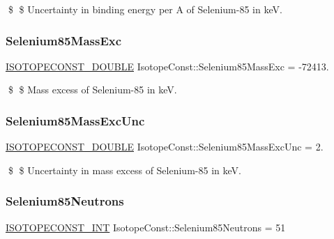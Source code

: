 \$ \$ Uncertainty in binding energy per A of Selenium-\/85 in keV. \mbox{\label{group___isotope_const-_selenium-_se85_ga3ffad5c7e9959d4405d59291e34cefa8}} 
\subsubsection{\texorpdfstring{Selenium85\+Mass\+Exc}{Selenium85MassExc}}
{\footnotesize\ttfamily \mbox{\hyperlink{group___isotope_const-_macros_ga8f45a7272ce02c0b4c65c44636ed719a}{I\+S\+O\+T\+O\+P\+E\+C\+O\+N\+S\+T\+\_\+\+D\+O\+U\+B\+LE}} Isotope\+Const\+::\+Selenium85\+Mass\+Exc = -\/72413.}

\$ \$ Mass excess of Selenium-\/85 in keV. \mbox{\label{group___isotope_const-_selenium-_se85_ga5c2b5fad192e6cfde80d8de9420aad96}} 
\subsubsection{\texorpdfstring{Selenium85\+Mass\+Exc\+Unc}{Selenium85MassExcUnc}}
{\footnotesize\ttfamily \mbox{\hyperlink{group___isotope_const-_macros_ga8f45a7272ce02c0b4c65c44636ed719a}{I\+S\+O\+T\+O\+P\+E\+C\+O\+N\+S\+T\+\_\+\+D\+O\+U\+B\+LE}} Isotope\+Const\+::\+Selenium85\+Mass\+Exc\+Unc = 2.}

\$ \$ Uncertainty in mass excess of Selenium-\/85 in keV. \mbox{\label{group___isotope_const-_selenium-_se85_ga5980a8472643e0f2956729a820f127fd}} 
\subsubsection{\texorpdfstring{Selenium85\+Neutrons}{Selenium85Neutrons}}
{\footnotesize\ttfamily \mbox{\hyperlink{group___isotope_const-_macros_ga5f18360b3e99483a35c32d789e62621c}{I\+S\+O\+T\+O\+P\+E\+C\+O\+N\+S\+T\+\_\+\+I\+NT}} Isotope\+Const\+::\+Selenium85\+Neutrons = 51}

